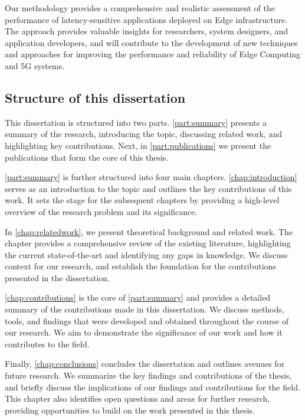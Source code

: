 Our methodology provides a comprehensive and realistic assessment of the performance of latency-sensitive applications deployed on Edge infrastructure.
The approach provides valuable insights for researchers, system designers, and application developers, and will contribute to the development of new techniques and approaches for improving the performance and reliability of Edge Computing and 5G systems.

\subsection{Structure of this dissertation}

This dissertation is structured into two parts.
\cref{part:summary} presents a summary of the research, introducing the topic, discussing related work, and highlighting key contributions.
Next, in \cref{part:publications} we present the publications that form the core of this thesis.

\cref{part:summary} is further structured into four main chapters.
\cref{chap:introduction} serves as an introduction to the topic and outlines the key contributions of this work.
It sets the stage for the subsequent chapters by providing a high-level overview of the research problem and its significance.

In \cref{chap:relatedwork}, we present theoretical background and related work.
The chapter provides a comprehensive review of the existing literature, highlighting the current state-of-the-art and identifying any gaps in knowledge.
We discuss context for our research, and establish the foundation for the contributions presented in the dissertation.

\cref{chap:contributions} is the core of \cref{part:summary} and provides a detailed summary of the contributions made in this dissertation.
We discuss methods, tools, and findings that were developed and obtained throughout the course of our research.
We aim to demonstrate the significance of our work and how it contributes to the field.

Finally, \cref{chap:conclusions} concludes the dissertation and outlines avenues for future research.
We summarize the key findings and contributions of the thesis, and briefly discuss the implications of our findings and contributions for the field.
This chapter also identifies open questions and areas for further research, providing opportunities to build on the work presented in this thesis.